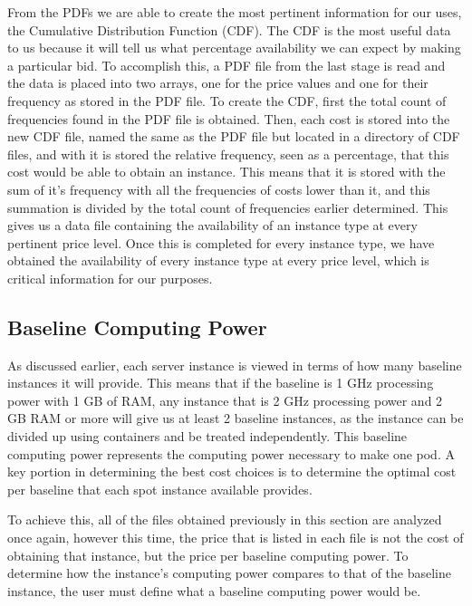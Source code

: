 \documentclass[thesis,proposal]{umassthesis}  %
\begin{document}
From the PDFs we are able to create the most pertinent information for our uses, the Cumulative Distribution Function (CDF). The CDF is the most useful data to us because it will tell us what percentage availability we can expect by making a particular bid. To accomplish this, a PDF file from the last stage is read and the data is placed into two arrays, one for the price values and one for their frequency as stored in the PDF file. To create the CDF, first the total count of frequencies found in the PDF file is obtained. Then, each cost is stored into the new CDF file, named the same as the PDF file but located in a directory of CDF files, and with it is stored the relative frequency, seen as a percentage, that this cost would be able to obtain an instance. This means that it is stored with the sum of it's frequency with all the frequencies of costs lower than it, and this summation is divided by the total count of frequencies earlier determined. This gives us a data file containing the availability of an instance type at every pertinent price level. Once this is completed for every instance type, we have obtained the availability of every instance type at every price level, which is critical information for our purposes.

\subsection{Baseline Computing Power}

As discussed earlier, each server instance is viewed in terms of how many baseline instances it will provide. This means that if the baseline is 1 GHz processing power with 1 GB of RAM, any instance that is 2 GHz processing power and 2 GB RAM or more will give us at least 2 baseline instances, as the instance can be divided up using containers and be treated independently. This baseline computing power represents the computing power necessary to make one pod. A key portion in determining the best cost choices is to determine the optimal cost per baseline that each spot instance available provides.\par

To achieve this, all of the files obtained previously in this section are analyzed once again, however this time, the price that is listed in each file is not the cost of obtaining that instance, but the price per baseline computing power. To determine how the instance's computing power compares to that of the baseline instance, the user must define what a baseline computing power would be.\par
\end{document}
